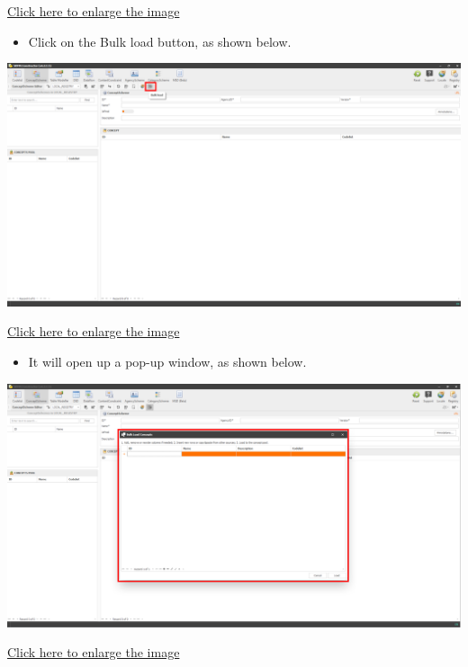 \documentclass[
]{book}
\providecommand{\tightlist}{%
  \setlength{\itemsep}{0pt}\setlength{\parskip}{0pt}}
\begin{document}
\href{images/image100.png}{Click here to enlarge the image}

\begin{itemize}
\tightlist
\item
  Click on the Bulk load button, as shown below.
\end{itemize}

\begin{center}\includegraphics[width=1\linewidth]{./images/image102} \end{center}

\href{images/image102.png}{Click here to enlarge the image}

\begin{itemize}
\tightlist
\item
  It will open up a pop-up window, as shown below.
\end{itemize}

\begin{center}\includegraphics[width=1\linewidth]{./images/image104} \end{center}

\href{images/image104.png}{Click here to enlarge the image}
\end{document}
